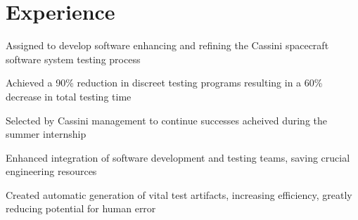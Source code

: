 \documentclass[letterpaper]{deedy-resume} %
\begin{document}
\hfill
%
%
\begin{minipage}[t]{0.66\textwidth} %


\section{Experience}


\vspace{\topsep} %
\begin{tightitemize}
\item Assigned to develop software enhancing and refining the Cassini spacecraft software system testing process
\item Achieved a 90\% reduction in discreet testing programs resulting in a 60\% decrease in total testing time
\end{tightitemize}

\sectionspace %



\begin{tightitemize}
\item Selected by Cassini management to continue successes acheived during the summer internship
\item Enhanced integration of software development and testing teams, saving crucial engineering resources
\item Created automatic generation of vital test artifacts, increasing efficiency, greatly reducing potential for human error
\end{tightitemize}

\sectionspace %


\end{minipage}
\end{document}
